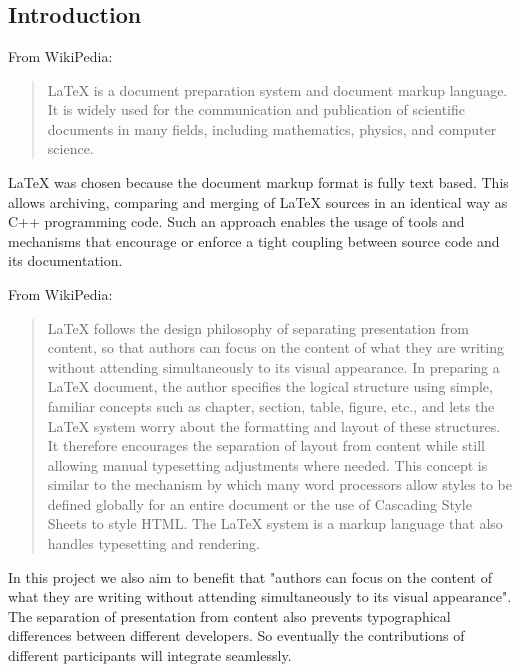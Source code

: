 \chapter{}
\label{sec:share000.latex}
\section{Introduction}

From WikiPedia:
\begin{quote}
LaTeX is a document preparation system and document markup language. It is
widely used for the communication and publication of scientific documents in
many fields, including mathematics, physics, and computer science.
\end{quote}

\noindent
LaTeX was chosen because the document markup format is fully text based. This
allows archiving, comparing and merging of LaTeX sources in an identical way as
C++ programming code. Such an approach enables the usage of tools and
mechanisms that encourage or enforce a tight coupling between source code and
its documentation.

\noindent
From WikiPedia:
\begin{quote}
LaTeX follows the design philosophy of separating presentation from content, so
that authors can focus on the content of what they are writing without
attending simultaneously to its visual appearance. In preparing a LaTeX
document, the author specifies the logical structure using simple, familiar
concepts such as chapter, section, table, figure, etc., and lets the LaTeX
system worry about the formatting and layout of these structures. It therefore
encourages the separation of layout from content while still allowing manual
typesetting adjustments where needed. This concept is similar to the mechanism
by which many word processors allow styles to be defined globally for an entire
document or the use of Cascading Style Sheets to style HTML. The LaTeX system
is a markup language that also handles typesetting and rendering.
\end{quote}

\noindent
In this project we also aim to benefit that "authors can focus on the content
of what they are writing without attending simultaneously to its visual
appearance". The separation of presentation from content also prevents
typographical differences between different developers. So eventually the
contributions of different participants will integrate seamlessly. 

